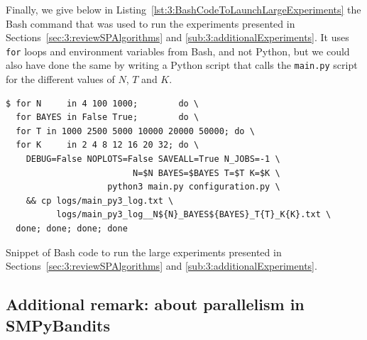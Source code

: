 Finally, we give below in Listing~\ref{lst:3:BashCodeToLaunchLargeExperiments} the Bash command that was used to run the experiments presented in Sections~\ref{sec:3:reviewSPAlgorithms} and \ref{sub:3:additionalExperiments}.
It uses \texttt{for} loops and environment variables from Bash, and not Python, but we could also have done the same by writing a Python script that calls the \texttt{main.py} script for the different values of $N$, $T$ and $K$.

\begin{listing}[h!]
    \begin{verbatim}
$ for N     in 4 100 1000;        do \
  for BAYES in False True;        do \
  for T in 1000 2500 5000 10000 20000 50000; do \
  for K     in 2 4 8 12 16 20 32; do \
    DEBUG=False NOPLOTS=False SAVEALL=True N_JOBS=-1 \
                         N=$N BAYES=$BAYES T=$T K=$K \
                    python3 main.py configuration.py \
    && cp logs/main_py3_log.txt \
          logs/main_py3_log__N${N}_BAYES${BAYES}_T{T}_K{K}.txt \
  done; done; done; done
    \end{verbatim}
    \caption{Snippet of Bash code to run the large experiments presented in Sections~\ref{sec:3:reviewSPAlgorithms} and \ref{sub:3:additionalExperiments}.}
    \label{lst:3:BashCodeToLaunchLargeExperiments}
\end{listing}


\subsection{Additional remark: about parallelism in SMPyBandits}
\label{sub:3:parallelSimulations}


